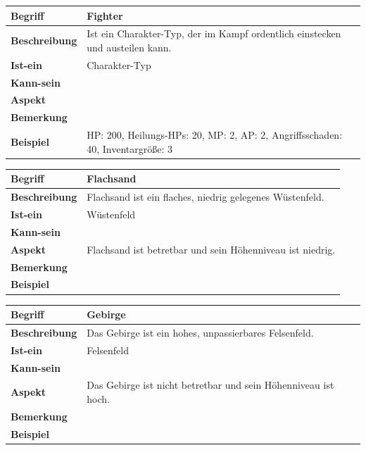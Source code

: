 \documentclass[12pt]{article}
\begin{document}
\begin{tabularx}{\linewidth}{|l|X|}
\hline
\textbf{Begriff} & \textbf{Fighter} \\
\hline
\textbf{Beschreibung} & Ist ein Charakter-Typ, der im Kampf ordentlich einstecken und austeilen kann. \\
\hline
\textbf{Ist-ein} & Charakter-Typ\\
\hline
\textbf{Kann-sein} & \\
\hline
\textbf{Aspekt} & \\
\hline
\textbf{Bemerkung} &  \\
\hline
\textbf{Beispiel} & HP: 200, Heilungs-HPs: 20, MP: 2, AP: 2, Angriffsschaden: 40, Inventargröße: 3 \\
\hline
\end{tabularx}

\begin{tabularx}{\linewidth}{|l|X|}
\hline
\textbf{Begriff} & \textbf{Flachsand} \\
\hline
\textbf{Beschreibung} & Flachsand ist ein flaches, niedrig gelegenes Wüstenfeld. \\
\hline
\textbf{Ist-ein} & Wüstenfeld\\
\hline
\textbf{Kann-sein} & \\
\hline
\textbf{Aspekt} & Flachsand ist betretbar und sein Höhenniveau ist niedrig.\\
\hline
\textbf{Bemerkung} &  \\
\hline
\textbf{Beispiel} &  \\
\hline
\end{tabularx}

\begin{tabularx}{\linewidth}{|l|X|}
\hline
\textbf{Begriff} & \textbf{Gebirge} \\
\hline
\textbf{Beschreibung} & Das Gebirge ist ein hohes, unpassierbares Felsenfeld. \\
\hline
\textbf{Ist-ein} & Felsenfeld\\
\hline
\textbf{Kann-sein} & \\
\hline
\textbf{Aspekt} & Das Gebirge ist nicht betretbar und sein Höhenniveau ist hoch. \\
\hline
\textbf{Bemerkung} &  \\
\hline
\textbf{Beispiel} &  \\
\hline
\end{tabularx}
\end{document}
